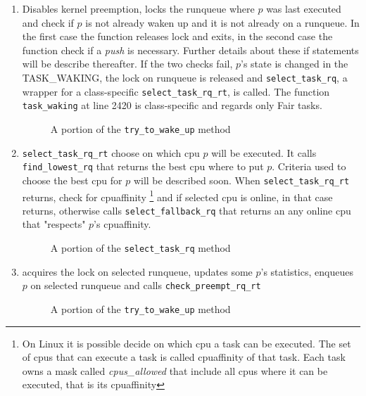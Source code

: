 \begin{enumerate}
\item Disables kernel preemption, locks the runqueue where $p$ was last executed and check 
if $p$ is not already waken up and it is not already on a runqueue. In the first case the 
function releases lock and exits, in the second case the function check if a
\textit{push} is necessary. Further details about these if statements will be
describe thereafter. If the two checks fail, $p$'s state is changed in the TASK\_WAKING, the
lock on runqueue is released and \texttt{select\_task\_rq}, a wrapper for a 
class-specific \texttt{select\_task\_rq\_rt}, is called. The function 
\texttt{task\_waking} at line 2420 is class-specific and regards only Fair tasks.

\begin{figure}[h]
  \lstset{basicstyle=\footnotesize, language=c, captionpos=b, frame=single,label=lis:steps}
  
  \label{code:steps_ttwu}
  \caption{A portion of the \texttt{try\_to\_wake\_up} method}
\end{figure}

\item \texttt{select\_task\_rq\_rt} choose on which cpu $p$ will be executed. It
calls \texttt{find\_lowest\_rq} that returns the best cpu where to put $p$. Criteria
used to choose the best cpu for $p$ will be described soon. When \texttt{select\_task\_rq\_rt} 
returns, check for cpuaffinity \footnote{On Linux it is possible decide on which
cpu a task can be executed. The set of cpus that can execute a task is called 
cpuaffinity of that task. Each task owns a mask called \textit{cpus\_allowed} 
that include all cpus where it can be executed, that is its cpuaffinity} and 
if selected cpu is online, in that case returns, otherwise calls 
\texttt{select\_fallback\_rq} that returns an any online cpu that "respects" 
$p$'s cpuaffinity.

\begin{figure}[h]
  \lstset{basicstyle=\footnotesize, language=c, captionpos=b, frame=single,label=lis:steps}
  
  \label{code:select_task}
  \caption{A portion of the \texttt{select\_task\_rq} method}
\end{figure}

\item acquires the lock on selected runqueue, updates some $p$'s statistics, enqueues 
$p$ on selected runqueue and calls \texttt{check\_preempt\_rq\_rt} 

\begin{figure}[h]
  \lstset{basicstyle=\footnotesize, language=c, captionpos=b, frame=single,label=lis:steps}
  
  \label{code:check_preempt}
  \caption{A portion of the \texttt{try\_to\_wake\_up} method}
\end{figure}


\end{enumerate}
